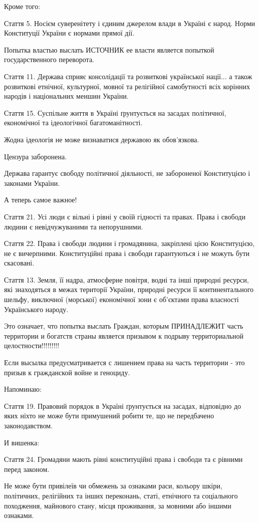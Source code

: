 \begin{itemize}
Кроме того:

Стаття 5. Носієм суверенітету і єдиним джерелом влади в Україні є народ. Норми
Конституції України є нормами прямої дії.  

Попытка властью выслать ИСТОЧНИК ее
власти является попыткой государственного переворота.

Стаття 11. Держава сприяє консолідації та розвиткові української нації... а
також розвиткові етнічної, культурної, мовної та релігійної самобутності всіх
корінних народів і національних меншин України.

Стаття 15. Суспільне життя в Україні ґрунтується на засадах політичної, економічної та ідеологічної багатоманітності.

Жодна ідеологія не може визнаватися державою як обов'язкова.

Цензура заборонена.

Держава гарантує свободу політичної діяльності, не забороненої Конституцією і
законами України.

А теперь самое важное!

Стаття 21. Усі люди є вільні і рівні у своїй гідності та правах. Права і
свободи людини є невідчужуваними та непорушними.

Стаття 22. Права і свободи людини і громадянина, закріплені цією Конституцією,
не є вичерпними. Конституційні права і свободи гарантуються і не можуть бути
скасовані.

Стаття 13. Земля, її надра, атмосферне повітря, водні та інші природні ресурси,
які знаходяться в межах території України, природні ресурси її континентального
шельфу, виключної (морської) економічної зони є об'єктами права власності
Українського народу.

Это означает, что попытка выслать Граждан, которым ПРИНАДЛЕЖИТ часть территории
и богатств страны является призывом к подрыву территориальной
целостности!!!!!!!!!

Если высылка предусматривается с лишением права на часть территории - это
призыв к гражданской войне и геноциду.

Напоминаю:

Стаття 19. Правовий порядок в Україні ґрунтується на засадах, відповідно до
яких ніхто не може бути примушений робити те, що не передбачено законодавством.

И вишенка:

Стаття 24. Громадяни мають рівні конституційні права і свободи та є рівними
перед законом.

Не може бути привілеїв чи обмежень за ознаками раси, кольору шкіри, політичних,
релігійних та інших переконань, статі, етнічного та соціального походження,
майнового стану, місця проживання, за мовними або іншими ознаками.


\end{itemize}
